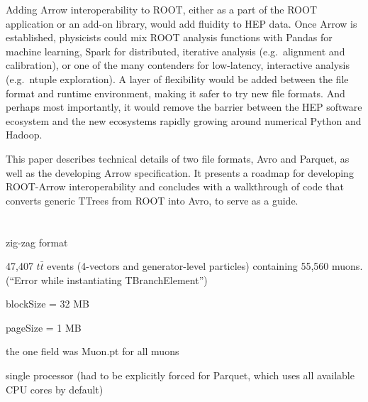 \documentclass{article}
\begin{document}
Adding Arrow interoperability to ROOT, either as a part of the ROOT application or an add-on library, would add fluidity to HEP data. Once Arrow is established, physicists could mix ROOT analysis functions with Pandas for machine learning, Spark for distributed, iterative analysis (e.g.\ alignment and calibration), or one of the many contenders for low-latency, interactive analysis (e.g.\ ntuple exploration). A layer of flexibility would be added between the file format and runtime environment, making it safer to try new file formats. And perhaps most importantly, it would remove the barrier between the HEP software ecosystem and the new ecosystems rapidly growing around numerical Python and Hadoop.

This paper describes technical details of two file formats, Avro and Parquet, as well as the developing Arrow specification. It presents a roadmap for developing ROOT-Arrow interoperability and concludes with a walkthrough of code that converts generic TTrees from ROOT into Avro, to serve as a guide.

\section*{}









\pagebreak

zig-zag format

47,407 $t\bar{t}$ events (4-vectors and generator-level particles) containing 55,560 muons. (``Error while instantiating TBranchElement'')

blockSize = 32 MB

pageSize = 1 MB

the one field was Muon.pt for all muons

single processor (had to be explicitly forced for Parquet, which uses all available CPU cores by default)

\renewcommand{\arraystretch}{1.2}
\end{document}
